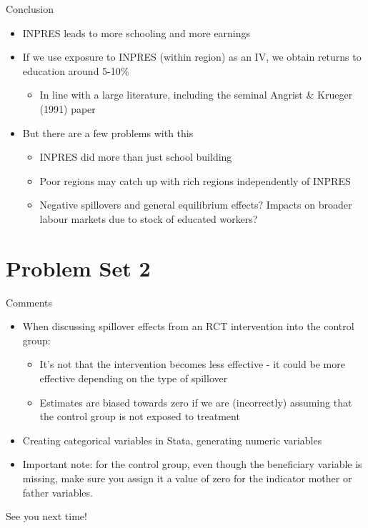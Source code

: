 \documentclass[11pt,notes=hide,aspectratio=169,mathserif]{beamer}
\begin{document}
\begin{frame}{Conclusion}
\begin{itemize}
\item INPRES leads to more schooling and more earnings
\item If we use exposure to INPRES (within region) as an IV, we obtain returns to education around 5-10\%
\begin{itemize}
    \item In line with a large literature, including the seminal Angrist \& Krueger (1991) paper
\end{itemize}
\item But there are a few problems with this 
\begin{itemize}
    \item INPRES did more than just school building
    \item Poor regions may catch up with rich regions independently of INPRES
    \item Negative spillovers and general equilibrium effects? Impacts on broader labour markets due to stock of educated workers?
\end{itemize}
\end{itemize}
\end{frame}

\section*{Problem Set 2}

\begin{frame}{Comments}
\begin{itemize}
    \item When discussing spillover effects from an RCT intervention into the control group:
    \begin{itemize}
        \item It's not that the intervention becomes less effective - it could be more effective depending on the type of spillover
        \item Estimates are biased towards zero if we are (incorrectly) assuming that the control group is not exposed to treatment
    \end{itemize}
    \item Creating categorical variables in Stata, generating numeric variables
    \item Important note: for the control group, even though the beneficiary variable is missing, make sure you assign it a value of zero for the indicator mother or father variables. 
\end{itemize}
\end{frame}




\begin{frame}
\begin{center}{\LARGE See you next time!}\end{center}
\end{frame}
\end{document}
